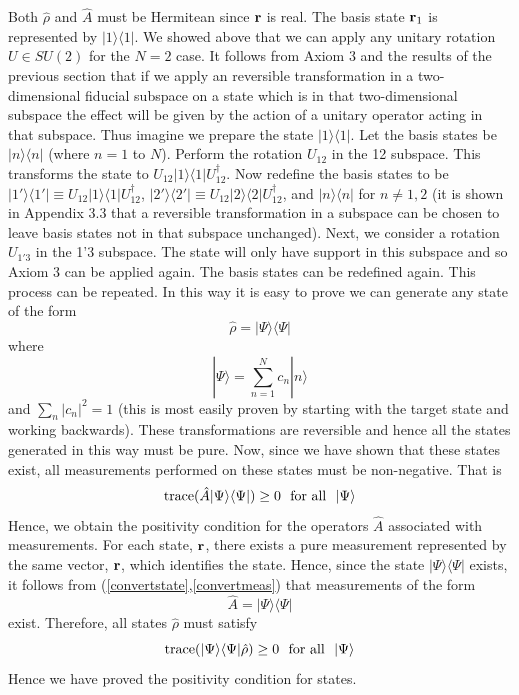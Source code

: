 \documentclass[12pt]{article}
\begin{document}
Both $\hat{\rho}$ and $\hat{A}$ must be Hermitean since $\bf r$ is real.
The basis state ${\bf r}_1$ is represented by
$|1\rangle\langle 1|$.  We showed above that we can apply any unitary
rotation $U\in SU(2)$ for the $N=2$ case. It follows from Axiom 3 and
the results of the previous section that
if we apply an reversible transformation in a two-dimensional fiducial
subspace on a state which is in that two-dimensional
subspace the effect will be given by the action of a unitary operator
acting in that subspace.
Thus imagine we prepare the state $|1\rangle\langle 1|$.  Let the basis
states be $|n\rangle\langle n|$ (where $n=1$ to $N$). Perform the
rotation $U_{12}$ in the 12 subspace.  This transforms the state to
$U_{12}|1\rangle\langle 1 |U_{12}^\dagger$. Now redefine the basis
states to be $|1'\rangle\langle 1'|\equiv
U_{12}|1\rangle\langle 1 |U_{12}^\dagger$,
$|2'\rangle\langle 2'|\equiv
U_{12}|2\rangle\langle 2 |U_{12}^\dagger$, and
$|n\rangle\langle n|$ for $n\not=1,2$ (it is shown in Appendix 3.3 that
a reversible transformation in a subspace can be chosen to leave basis
states not in that subspace unchanged).  Next, we consider a rotation
$U_{1'3}$ in the 1'3 subspace.  The state will only have support in this
subspace and so Axiom 3 can be applied again.  The basis states can be
redefined again.  This process can be repeated. In this way it is easy
to prove we can generate any state of the form
\begin{equation}
\hat{\rho}=|\Psi\rangle\langle\Psi |
\end{equation}
where
\begin{equation}
|\Psi\rangle=\sum_{n=1}^N c_n|n\rangle
\end{equation}
and $\sum_n |c_n|^2=1$ (this is most easily proven by starting with the
target state and working backwards).
These transformations are reversible and hence all
the states generated in this way must be pure.  Now, since we have shown
that these states exist, all measurements performed on these states must
be non-negative.  That is
\begin{equation}
{\rm trace}(\hat{A} |\Psi\rangle\langle\Psi | ) \geq 0 ~~{\rm for ~ all}~~
|\Psi\rangle
\end{equation}
Hence, we obtain the positivity condition for the operators $\hat{A}$
associated with measurements.
For each state, ${\bf r}$, there exists a pure measurement represented
by the same
vector, ${\bf r}$, which identifies the state.  Hence, since the state
$|\Psi\rangle\langle\Psi |$
exists, it follows from (\ref{convertstate},\ref{convertmeas}) that
measurements of the form
\begin{equation}
\hat{A}=|\Psi\rangle\langle\Psi |
\end{equation}
exist.  Therefore, all states $\hat{\rho}$ must satisfy
\begin{equation}
{\rm trace}(|\Psi\rangle\langle\Psi |\hat{\rho} ) \geq 0 ~~{\rm for ~ all}~~
|\Psi\rangle
\end{equation}
Hence we have proved the positivity condition for states.
\end{document}

